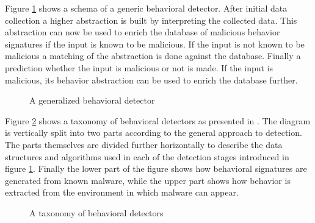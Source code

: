Figure \ref{fig_gen_behav_detector} shows a schema of a generic behavioral detector. After initial data collection a higher abstraction is built by interpreting the collected data. This abstraction can now be used to enrich the database of malicious behavior signatures if the input is known to be malicious. If the input is not known to be malicious a matching of the abstraction is done against the database. Finally a prediction whether the input is malicious or not is made. If the input is malicious, its behavior abstraction can be used to enrich the database further.

\begin{figure}[H]
    \centering
    \caption{A generalized behavioral detector}
    \label{fig_gen_behav_detector}
\end{figure}

Figure \ref{fig_behav_det_tax} shows a taxonomy of behavioral detectors as presented in \cite{Jacob08}. The diagram is vertically split into two parts according to the general approach to detection. The parts themselves are divided further horizontally to describe the data structures and algorithms used in each of the detection stages introduced in figure \ref{fig_gen_behav_detector}. Finally the lower part of the figure shows how behavioral signatures are generated from known malware, while the upper part shows how behavior is extracted from the environment in which malware can appear.

\begin{figure}[H]
    \centering
    \caption{A taxonomy of behavioral detectors}
    \label{fig_behav_det_tax}
\end{figure}

